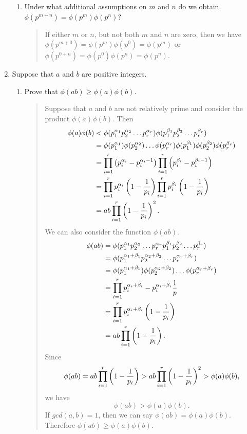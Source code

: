 \documentclass{hw}
\begin{document}
\begin{enumerate}
\begin{enumerate}
\item Under what additional assumptions on $m$ and $n$ do we obtain
$\phi(p^{m+n})=\phi(p^{m})\phi(p^{n})$?
\begin{quote}
If either $m$ or $n$, but not both $m$ and $n$ are zero, then we have
$\phi(p^{m+0})=\phi(p^{m})\phi(p^{0})=\phi(p^{m})$ or
$\phi(p^{0+n})=\phi(p^{0})\phi(p^{n})=\phi(p^{n})$.
\end{quote}
\end{enumerate}

\item Suppose that $a$ and $b$ are positive integers.
\begin{enumerate}
\item Prove that $\phi(ab)\geq\phi(a)\phi(b)$.
\begin{quote}
Suppose that $a$ and $b$ are not relatively prime and consider the product $\phi(a)\phi(b)$. Then
\begin{align*}
\phi(a)\phi(b) &<
\phi(p_{1}^{\alpha_{1}}p_{2}^{\alpha_{2}}\dots p_{r}^{\alpha_{r}})
\phi(p_{1}^{\beta_{1}}p_{2}^{\beta_{2}}\dots p_{r}^{\beta_{r}})\\
&= \phi(p_{1}^{\alpha_{1}})\phi(p_{2}^{\alpha_{2}})\dots \phi(p_{r}^{\alpha_{r}})
\phi(p_{1}^{\beta_{1}})\phi(p_{2}^{\beta_{2}})\phi(p_{r}^{\beta_{r}})\\
&= \prod_{i=1}^{r}\left(p_{i}^{\alpha_{i}}-p_{i}^{\alpha_{i}-1}\right)
\prod_{i=1}^{r}\left(p_{i}^{\beta_{i}}-p_{i}^{\beta_{i}-1}\right)\\
&= \prod_{i=1}^{r}p_{i}^{\alpha_{i}}\left(1-{1\over p_{i}}\right)
\prod_{i=1}^{r}p_{i}^{\beta_{i}}\left(1-{1\over p_{i}}\right)\\
&= ab\prod_{i=1}^{r}\left(1-{1\over p_{i}}\right)^{2}.
\end{align*}
We can also consider the function $\phi(ab)$.
\begin{align*}
\phi(ab) &= \phi(p_{1}^{\alpha_{1}}p_{2}^{\alpha_{2}}\dots p_{r}^{\alpha_{r}}
p_{1}^{\beta_{1}}p_{2}^{\beta_{2}}\dots p_{r}^{\beta_{r}})\\
&= \phi(p_{1}^{\alpha_{1}+\beta_{1}}p_{2}^{\alpha_{2}+\beta_{2}}\dots p_{r}^{\alpha_{r}+\beta_{r}})\\
&= \phi(p_{1}^{\alpha_{1}+\beta_{1}})\phi(p_{2}^{\alpha_{2}+\beta_{2}})\dots
\phi(p_{r}^{\alpha_{r}+\beta_{r}})\\
&= \prod_{i=1}^{r}p_{i}^{\alpha_{i}+\beta_{i}}-p_{i}^{\alpha_{i}+\beta_{i}}{1\over p}\\
&= \prod_{i=1}^{r}p_{i}^{\alpha_{i}+\beta_{i}}\left(1-{1\over p_{i}}\right)\\
&= ab\prod_{i=1}^{r}\left(1-{1\over p_{i}}\right).
\end{align*}
Since
\[
\phi(ab)=ab\prod_{i=1}^{r}\left(1-{1\over p_{i}}\right) >
ab\prod_{i=1}^{r}\left(1-{1\over p_{i}}\right)^{2}>\phi(a)\phi(b),
\]
we have
\[
\phi(ab) > \phi(a)\phi(b).
\]
If $gcd(a,b)=1$, then we can say $\phi(ab) = \phi(a)\phi(b)$. Therefore $\phi(ab)\geq\phi(a)\phi(b)$.
\end{quote}


\end{enumerate}
\end{enumerate}
\end{document}
